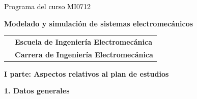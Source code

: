 \documentclass[letterpaper]{article}%
\begin{document}
%
\normalsize%
\thispagestyle{empty}%
%
\vspace*{100mm}%
\par\fontsize{14}{0}\selectfont \textcolor{black}{Programa del curso MI0712}%
\par\fontsize{18}{25}\selectfont \textbf{\textcolor{azulsuaveTEC}{Modelado y simulación de sistemas electromecánicos}}%
\vspace*{15mm}%
\newline%
\begin{tabularx}{\textwidth}{m{}m{}}%
&\hspace*{0mm}\fontsize{12}{0}\selectfont \textbf{\textcolor{gris}{Escuela de Ingeniería Electromecánica}}\\%
[-12pt]%
&\hspace*{0mm}\fontsize{12}{0}\selectfont \textbf{\textcolor{gris}{Carrera de Ingeniería Electromecánica}}\\%
\end{tabularx}%
\newpage%
\pagestyle{headfoot}%
\par\fontsize{14}{0}\selectfont \textbf{\textcolor{parte}{I parte: Aspectos relativos al plan de estudios}}%
\par\hspace*{2mm}\fontsize{12}{14}\selectfont \textbf{\textcolor{parte}{1. Datos generales}}%
\vspace*{3mm}%
\newline%
\fontsize{10}{12}\selectfont %
\end{document}
